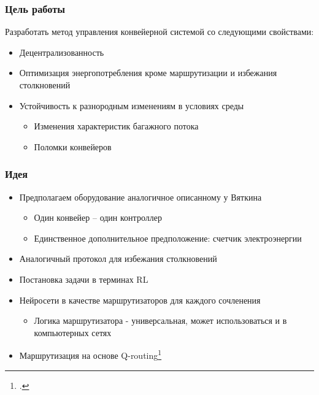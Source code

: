 \documentclass{beamer}
\begin{document}

\begin{frame}
  \frametitle{Цель работы}
  Разработать метод управления конвейерной системой со следующими свойствами:
  \begin{itemize}
  \item Децентрализованность
  \item Оптимизация энергопотребления кроме маршрутизации и избежания столкновений
  \item Устойчивость к разнородным изменениям в условиях среды
    \begin{itemize}
    \item Изменения характеристик багажного потока
    \item Поломки конвейеров
    \end{itemize}
  \end{itemize}
\end{frame}


\begin{frame}
  \frametitle{Идея}
  \begin{itemize}
  \item Предполагаем оборудование аналогичное описанному у Вяткина
    \begin{itemize}
    \item Один конвейер -- один контроллер
    \item Единственное дополнительное предположение: счетчик электроэнергии
    \end{itemize}
  \item Аналогичный протокол для избежания столкновений
  \item Постановка задачи в терминах RL
  \item Нейросети в качестве маршрутизаторов для каждого сочленения
     \begin{itemize}
     \item Логика маршрутизатора - универсальная, может использоваться и в компьютерных сетях
     \end{itemize}
  \item Маршрутизация на основе Q-routing\footcite{q-routing-orig}
  \end{itemize}
\end{frame}

\end{document}
